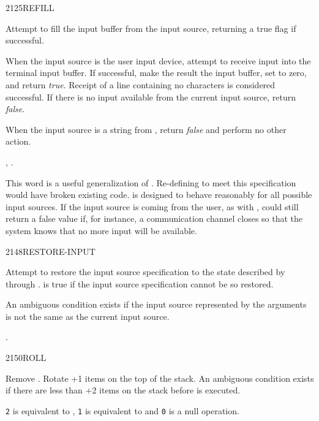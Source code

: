\begin{worddef}{2125}{REFILL}
\item {}

	Attempt to fill the input buffer from the input source,
	returning a true flag if successful.

	When the input source is the user input device, attempt to
	receive input into the terminal input buffer. If successful,
	make the result the input buffer, set  to zero, and
	return \emph{true}. Receipt of a line containing no characters
	is considered successful. If there is no input available from
	the current input source, return \emph{false}.

	When the input source is a string from , return
	\emph{false} and perform no other action.

\see {},
	.

	\begin{defer}
	\rationale %
		This word is a useful generalization of .
		Re-defining  to meet this specification would
		have broken existing code.  is designed to behave
		reasonably for all possible input sources. If the input source
		is coming from the user, as with , 
		could still return a false value if, for instance, a
		communication channel closes so that the system knows that no
		more input will be available.
	\end{defer}
\end{worddef}


\begin{worddef}{2148}{RESTORE-INPUT}
\item {}

	Attempt to restore the input source specification to the state
	described by  through .  is
	true if the input source specification cannot be so restored.

	An ambiguous condition exists if the input source represented
	by the arguments is not the same as the current input source.

\see {}.
\end{worddef}


\begin{worddef}{2150}{ROLL}
\item {}

	Remove . Rotate +1 items on the top of the stack.
	An ambiguous condition exists if there are less than +2
	items on the stack before  is executed.

	\begin{defer}
	\rationale %
		\texttt{2}  is equivalent to \word{ROT},
		\texttt{1}  is equivalent to \word{SWAP} and
		\texttt{0}  is a null operation.
	\end{defer}
\end{worddef}


